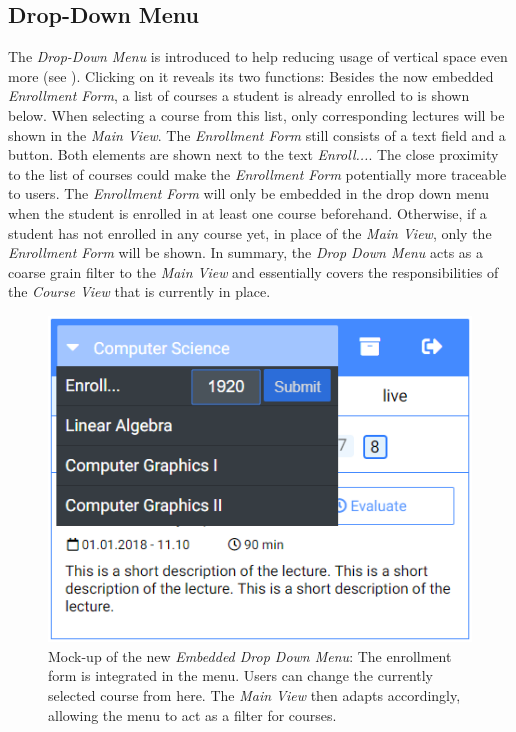 \subsection{Drop-Down Menu}
\label{section:con:proposals:dropdown}
The \emph{Drop-Down Menu} is introduced to help reducing usage of vertical space even more (see ). Clicking on it reveals its two functions: Besides the now embedded \emph{Enrollment Form}, a list of courses a student is already enrolled to is shown below.
When selecting a course from this list, only corresponding lectures will be shown in the \emph{Main View}.
The \emph{Enrollment Form} still consists of a text field and a button. Both elements are shown next to the text \emph{Enroll...}. The close proximity to the list of courses could make the \emph{Enrollment Form} potentially more traceable to users. The \emph{Enrollment Form} will only be embedded in the drop down menu when the student is enrolled in at least one course beforehand. Otherwise, if a student has not enrolled in any course yet, in place of the \emph{Main View}, only the \emph{Enrollment Form} will be shown.
In summary, the \emph{Drop Down Menu} acts as a coarse grain filter to the \emph{Main View} and essentially covers the responsibilities of the \emph{Course View} that is currently in place.

\begin{figure}[ht]
	\begin{minipage}[t]{\textwidth}
		\centering
		\includegraphics[width=.7\textwidth]{mockups/embedded_drop_down.png}
		\captionsetup{width=.8\linewidth}
		\caption{Mock-up of the new \emph{Embedded Drop Down Menu}:
			The enrollment form is integrated in the menu. Users can change the currently selected course from here. The \emph{Main View} then adapts accordingly, allowing the menu to act as a filter for courses.
		}
		\label{figure:embeddeddropdown}
	\end{minipage}
\end{figure}

